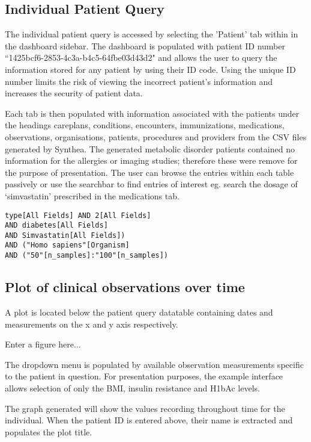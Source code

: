 \documentclass{bioinfo}
\begin{document}
\subsection{Individual Patient Query}

The individual patient query is accessed by selecting the 'Patient' tab within in the dashboard sidebar. The dashboard is populated with patient ID number ``1425bcf6-2853-4c3a-b4c5-64fbe03d43d2" and allows the user to query the information stored for any patient by using their ID code. Using the unique ID number limits the risk of viewing the incorrect patient's information and increases the security of patient data. 

Each tab is then populated with information associated with the patient\textquotesingles s under the headings careplans, conditions, encounters, immunizations, medications, observations, organisations, patients, procedures and providers from the CSV files generated by  Synthea. The generated metabolic disorder patients contained no information for the allergies or imaging studies; therefore these were remove for the purpose of presentation. The user can browse the entries within each table passively or use the searchbar to find entries of interest eg. search the dosage of `simvastatin' prescribed in the medications tab. 

\begin{verbatim}
type[All Fields] AND 2[All Fields] 
AND diabetes[All Fields] 
AND Simvastatin[All Fields])
AND ("Homo sapiens"[Organism] 
AND ("50"[n_samples]:"100"[n_samples])

\end{verbatim}

\subsection{Plot of clinical observations over time}
A plot is located below the patient query datatable containing dates and measurements on the x and y axis respectively. 
 
Enter a figure here... 

The dropdown menu is populated by available observation measurements specific to the patient in question. For presentation purposes, the example interface allows selection of only the BMI, insulin resistance and H1bAc levels.

The graph generated will show the values recording throughout time for the individual. When the patient ID is entered above, their name is extracted and populates the plot title. 
\end{document}
